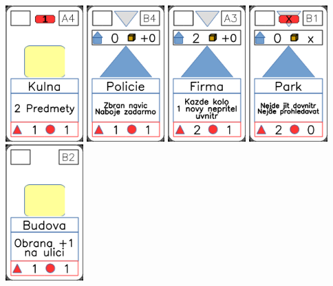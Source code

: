 \documentclass[a4paper]{article}
\begin{document}
	\includegraphics[width=3.0cm]{img-2_18}
	\includegraphics[width=3.0cm]{img-3_8}
	\includegraphics[width=3.0cm]{img-3_17}
	\includegraphics[width=3.0cm]{img-3_20}
	\includegraphics[width=3.0cm]{img-2_6}
\end{document}
